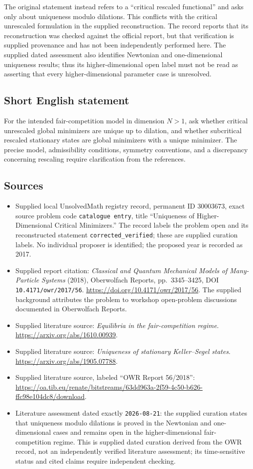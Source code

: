\documentclass[11pt]{article}
\begin{document}
The original statement instead refers to a ``critical rescaled functional'' and asks only about uniqueness modulo dilations. This conflicts with the critical unrescaled formulation in the supplied reconstruction. The record reports that its reconstruction was checked against the official report, but that verification is supplied provenance and has not been independently performed here. The supplied dated assessment also identifies Newtonian and one-dimensional uniqueness results; thus its higher-dimensional open label must not be read as asserting that every higher-dimensional parameter case is unresolved.
\subsection{Short English statement}
For the intended fair-competition model in dimension \(N>1\), ask whether critical unrescaled global minimizers are unique up to dilation, and whether subcritical rescaled stationary states are global minimizers with a unique minimizer. The precise model, admissibility conditions, symmetry conventions, and a discrepancy concerning rescaling require clarification from the references.
\subsection{Sources}
\begin{itemize}
\item Supplied local UnsolvedMath registry record, permanent ID \(30003673\), exact source problem code \texttt{catalogue entry}, title ``Uniqueness of Higher-Dimensional Critical Minimizers.'' The record labels the problem open and its reconstructed statement \texttt{corrected\_verified}; these are supplied curation labels. No individual proposer is identified; the proposed year is recorded as 2017.
\item Supplied report citation: \emph{Classical and Quantum Mechanical Models of Many-Particle Systems} (2018), Oberwolfach Reports, pp.\ 3345--3425, DOI \texttt{10.4171/owr/2017/56}. \url{https://doi.org/10.4171/owr/2017/56}. The supplied background attributes the problem to workshop open-problem discussions documented in Oberwolfach Reports.
\item Supplied literature source: \emph{Equilibria in the fair-competition regime}. \url{https://arxiv.org/abs/1610.00939}.
\item Supplied literature source: \emph{Uniqueness of stationary Keller--Segel states}. \url{https://arxiv.org/abs/1905.07788}.
\item Supplied literature source, labeled ``OWR Report 56/2018'': \url{https://oa.tib.eu/renate/bitstreams/63dd963a-2f59-4c50-b626-ffc98e104dc8/download}.
\item Literature assessment dated exactly \texttt{2026-08-21}: the supplied curation states that uniqueness modulo dilations is proved in the Newtonian and one-dimensional cases and remains open in the higher-dimensional fair-competition regime. This is supplied dated curation derived from the OWR record, not an independently verified literature assessment; its time-sensitive status and cited claims require independent checking.
\end{itemize}
\end{document}
